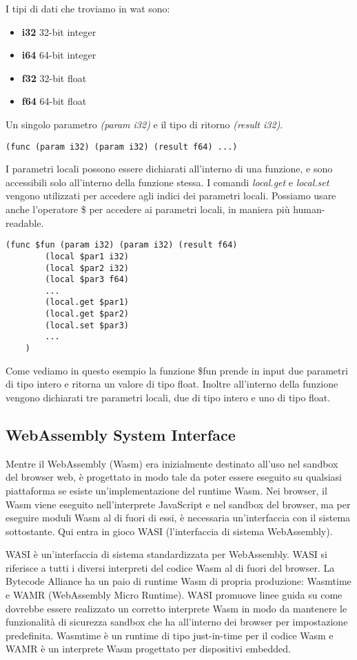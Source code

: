 \documentclass[../../main.tex]{subfiles}
\begin{document}
I tipi di dati che troviamo in wat sono:
\begin{itemize}
    \item \textbf{i32} 32-bit integer
    \item \textbf{i64} 64-bit integer
    \item \textbf{f32} 32-bit float
    \item \textbf{f64} 64-bit float
\end{itemize}
Un singolo  parametro \textit{(param i32)} e il tipo di ritorno \textit{(result i32)}.
\begin{lstlisting}[language=WebAssembly, caption={Esempio di funzione in wat}, label={lst:funzioneWat}]
    (func (param i32) (param i32) (result f64) ...)
\end{lstlisting}
I parametri locali possono essere dichiarati all'interno di una funzione, e sono accessibili solo all'interno della funzione stessa.
I comandi \textit{local.get} e \textit{local.set} vengono utilizzati per accedere agli indici dei parametri locali.
Possiamo usare anche l'operatore \$ per accedere ai parametri locali, in maniera più human-readable.
\begin{lstlisting}[language=WebAssembly, caption={Esempio di funzione in wat}, label={lst:funzioneWat}]
    (func $fun (param i32) (param i32) (result f64)
        (local $par1 i32)
        (local $par2 i32)
        (local $par3 f64)
        ...
        (local.get $par1)
        (local.get $par2)
        (local.set $par3)
        ...
    )
\end{lstlisting}
Come vediamo in questo esempio la funzione \$fun prende in input due parametri di tipo intero e ritorna un valore di tipo float. Inoltre all'interno della funzione vengono dichiarati tre parametri locali, due di tipo intero e uno di tipo float.

\subsection{WebAssembly System Interface}
Mentre il WebAssembly (Wasm) era inizialmente destinato all'uso nel sandbox del browser web, è progettato in modo tale da poter essere eseguito su qualsiasi piattaforma se esiste un'implementazione del runtime Wasm. Nei browser, il Wasm viene eseguito nell'interprete JavaScript e nel sandbox del browser, ma per eseguire moduli Wasm al di fuori di essi, è necessaria un'interfaccia con il sistema sottostante. Qui entra in gioco WASI (l'interfaccia di sistema WebAssembly).

WASI è un'interfaccia di sistema standardizzata per WebAssembly. 
WASI si riferisce a tutti i diversi interpreti del codice Wasm al di fuori del browser. La Bytecode Alliance ha un paio di runtime Wasm di propria produzione: Wasmtime e WAMR (WebAssembly Micro Runtime). WASI promuove linee guida su come dovrebbe essere realizzato un corretto interprete Wasm in modo da mantenere le funzionalità di sicurezza sandbox che ha all'interno dei browser per impostazione predefinita. Wasmtime è un runtime di tipo just-in-time per il codice Wasm e WAMR è un interprete Wasm progettato per dispositivi embedded.\autocite{niemela2021webassembly}
\end{document}
